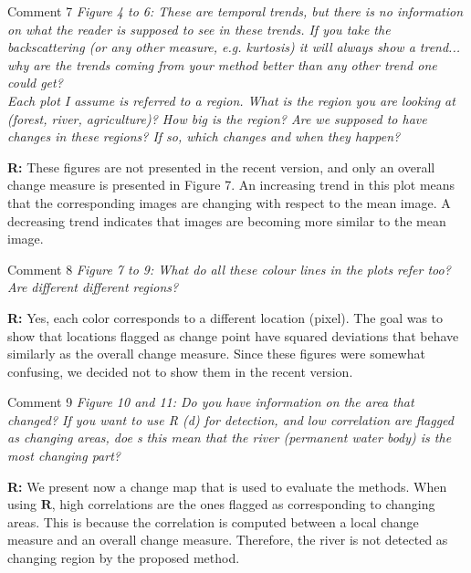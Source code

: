 \documentclass[11pt]{report}
\begin{document}
\medskip
\begin{mybox}{Comment 7}
\textit{Figure 4 to 6: These are temporal trends, but there is no information on what the reader is supposed to see
in these trends. If you take the backscattering (or any other measure, e.g. kurtosis) it will always show a trend...
why are the trends coming from your method better than any other trend one could get?\\
Each plot I assume is referred to a region. What is the region you are looking at (forest, river, agriculture)?
How big is the region? Are we supposed to have changes in these regions? If so, which changes and when they
happen?}


\medskip
\textbf{R:} These figures are not presented in the recent version, and only an overall change measure is presented in Figure 7. An increasing trend in this plot means that the corresponding images are changing with respect to the mean image. A decreasing trend indicates that images are becoming more similar to the mean image.
\end{mybox}

\medskip
\begin{mybox}{Comment 8}
\textit{Figure 7 to 9: What do all these colour lines in the plots refer too? Are different different regions?}


\medskip
\textbf{R:} Yes, each color corresponds to a different location (pixel). The goal was to show that locations flagged as change point have squared deviations that behave similarly as the overall change measure. Since these figures were somewhat confusing, we decided not to show them in the recent version.
\end{mybox}

\medskip
\begin{mybox}{Comment 9}
\textit{Figure 10 and 11: Do you have information on the area that changed? If you want to use R (d) for detection,
and low correlation are flagged as changing areas, doe s this mean that the river (permanent water body) is the
most changing part?}

\medskip
\textbf{R:} We present now a change map that is used to evaluate the methods. When using $\mathbf{R}$, high correlations are the ones flagged as corresponding to changing areas. This is because the correlation is computed between a local change measure and an overall change measure. Therefore, the river is not detected as changing region by the proposed method.
\end{mybox}
\end{document}
